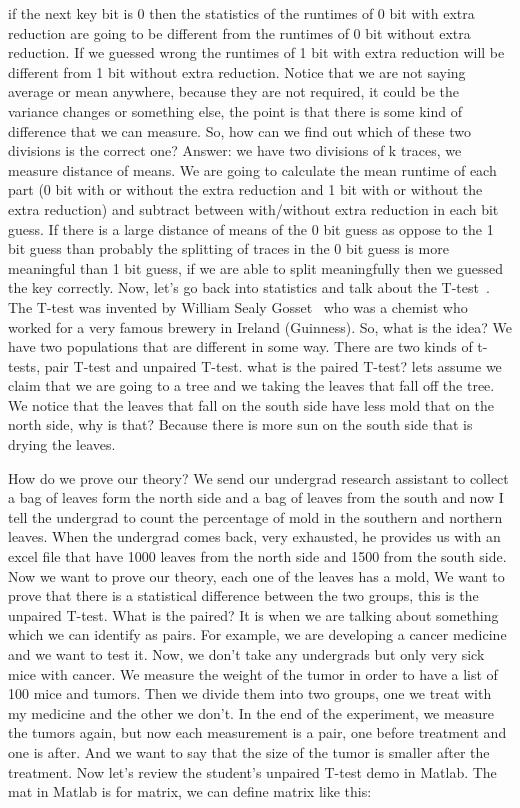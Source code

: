 if the next key bit is 0 then the statistics of the runtimes of 0 bit with extra reduction are going to be different from the runtimes of 0 bit without extra reduction. If we guessed wrong the runtimes of 1 bit with extra reduction will be different from 1 bit without extra reduction. Notice that we are not saying average or mean anywhere, because they are not required, it could be the variance changes or something else, the point is that there is some kind of difference that we can measure. So, how can we find out which of these two divisions is the correct one? Answer: we have two divisions of k traces, we measure distance of means. We are going to calculate the mean runtime of each part (0 bit with or without the extra reduction and 1 bit with or without the extra reduction) and subtract between with/without extra reduction in each bit guess. If there is a large distance of means of the 0 bit guess as oppose to the 1 bit guess than probably the splitting of traces in the 0 bit guess is more meaningful than 1 bit guess, if we are able to split meaningfully then we guessed the key correctly. 
Now, let's go back into statistics and talk about the T-test~\cite{wikittest}. The T-test was invented by William Sealy Gosset~\cite{wikigosset} who was a chemist who worked for a very famous brewery in Ireland (Guinness). So, what is the idea? We have two populations that are different in some way. There are two kinds of t-tests, pair T-test and unpaired T-test. what is the paired T-test? lets assume we claim that we are going to a tree and we taking the leaves that fall off the tree. We notice that the leaves that fall on the south side have less mold that on the north side, why is that? Because there is more sun on the south side that is drying the leaves. 

How do we prove our theory? We send our undergrad research assistant to collect a bag of leaves form the north side and a bag of leaves from the south and now I tell the undergrad to count the percentage of mold in the southern and northern leaves. When the undergrad comes back, very exhausted, he provides us with an excel file that have 1000 leaves from the north side and 1500 from the south side. Now we want to prove our theory, each one of the leaves has a mold, We want to prove that there is a statistical difference between the two groups, this is the unpaired T-test. What is the paired? It is when we are talking about something which we can identify as pairs. For example, we are developing a cancer medicine and we want to test it. Now, we don't take any undergrads but only very sick mice with cancer. We measure the weight of the tumor in order to have a list of 100 mice and tumors. Then we divide them into two groups, one we treat with my medicine and the other we don't. In the end of the experiment, we measure the tumors again, but now each measurement is a pair, one before treatment and one is after. And we want to say that the size of the tumor is smaller after the treatment. 
Now let's review the student's unpaired T-test demo in Matlab. The mat in Matlab is for matrix, we can define matrix like this:

